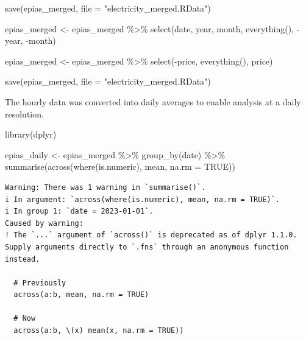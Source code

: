 \documentclass[
]{article}
\newenvironment{Shaded}{\begin{snugshade}}{\end{snugshade}}
\newcommand{\AttributeTok}[1]{\textcolor[rgb]{0.40,0.45,0.13}{#1}}
\newcommand{\ConstantTok}[1]{\textcolor[rgb]{0.56,0.35,0.01}{#1}}
\newcommand{\FunctionTok}[1]{\textcolor[rgb]{0.28,0.35,0.67}{#1}}
\newcommand{\NormalTok}[1]{\textcolor[rgb]{0.00,0.23,0.31}{#1}}
\newcommand{\OtherTok}[1]{\textcolor[rgb]{0.00,0.23,0.31}{#1}}
\newcommand{\SpecialCharTok}[1]{\textcolor[rgb]{0.37,0.37,0.37}{#1}}
\newcommand{\StringTok}[1]{\textcolor[rgb]{0.13,0.47,0.30}{#1}}
\begin{document}
\begin{Shaded}
\begin{Highlighting}[]
\FunctionTok{save}\NormalTok{(epias\_merged, }\AttributeTok{file =} \StringTok{"electricity\_merged.RData"}\NormalTok{)}

\NormalTok{epias\_merged }\OtherTok{\textless{}{-}}\NormalTok{ epias\_merged }\SpecialCharTok{\%\textgreater{}\%}
  \FunctionTok{select}\NormalTok{(date, year, month, }\FunctionTok{everything}\NormalTok{(), }\SpecialCharTok{{-}}\NormalTok{year, }\SpecialCharTok{{-}}\NormalTok{month)}

\NormalTok{epias\_merged }\OtherTok{\textless{}{-}}\NormalTok{ epias\_merged }\SpecialCharTok{\%\textgreater{}\%}
  \FunctionTok{select}\NormalTok{(}\SpecialCharTok{{-}}\NormalTok{price, }\FunctionTok{everything}\NormalTok{(), price)}

\FunctionTok{save}\NormalTok{(epias\_merged, }\AttributeTok{file =} \StringTok{"electricity\_merged.RData"}\NormalTok{)}
\end{Highlighting}
\end{Shaded}

The hourly data was converted into daily averages to enable analysis at
a daily resolution.

\begin{Shaded}
\begin{Highlighting}[]
\FunctionTok{library}\NormalTok{(dplyr)}

\NormalTok{epias\_daily }\OtherTok{\textless{}{-}}\NormalTok{ epias\_merged }\SpecialCharTok{\%\textgreater{}\%}
  \FunctionTok{group\_by}\NormalTok{(date) }\SpecialCharTok{\%\textgreater{}\%}
  \FunctionTok{summarise}\NormalTok{(}\FunctionTok{across}\NormalTok{(}\FunctionTok{where}\NormalTok{(is.numeric), mean, }\AttributeTok{na.rm =} \ConstantTok{TRUE}\NormalTok{))}
\end{Highlighting}
\end{Shaded}

\begin{verbatim}
Warning: There was 1 warning in `summarise()`.
i In argument: `across(where(is.numeric), mean, na.rm = TRUE)`.
i In group 1: `date = 2023-01-01`.
Caused by warning:
! The `...` argument of `across()` is deprecated as of dplyr 1.1.0.
Supply arguments directly to `.fns` through an anonymous function instead.

  # Previously
  across(a:b, mean, na.rm = TRUE)

  # Now
  across(a:b, \(x) mean(x, na.rm = TRUE))
\end{verbatim}
\end{document}
